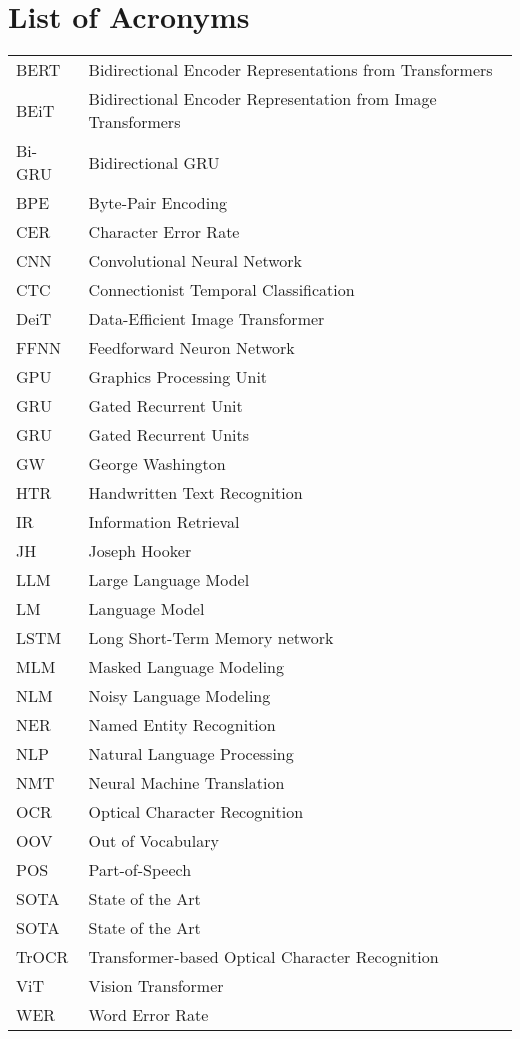 {}
\chapter*{List of Acronyms}

\begin{supertabular}{lp{12.5cm}}
    BERT & Bidirectional Encoder Representations from Transformers\\
    BEiT & Bidirectional Encoder Representation from Image Transformers\\
    Bi-GRU & Bidirectional GRU\\
    BPE & Byte-Pair Encoding\\
    CER & Character Error Rate\\
    CNN & Convolutional Neural Network\\
    CTC & Connectionist Temporal Classification\\
    DeiT & Data-Efficient Image Transformer\\
    FFNN & Feedforward Neuron Network\\
    GPU & Graphics Processing Unit\\
    GRU & Gated Recurrent Unit\\
    GRU & Gated Recurrent Units\\
    GW & George Washington\\
    HTR & Handwritten Text Recognition\\
    IR & Information Retrieval\\
    JH & Joseph Hooker\\
    LLM & Large Language Model\\
    LM & Language Model\\
    LSTM & Long Short-Term Memory network\\
    MLM & Masked Language Modeling\\
    NLM & Noisy Language Modeling\\
    NER & Named Entity Recognition\\
    NLP & Natural Language Processing\\
    NMT & Neural Machine Translation\\
    OCR & Optical Character Recognition\\
    OOV & Out of Vocabulary\\
    POS & Part-of-Speech\\
    SOTA & State of the Art\\
    SOTA & State of the Art\\
    TrOCR & Transformer-based Optical Character Recognition\\
    ViT & Vision Transformer\\
    WER & Word Error Rate\\
\end{supertabular}

\newpage